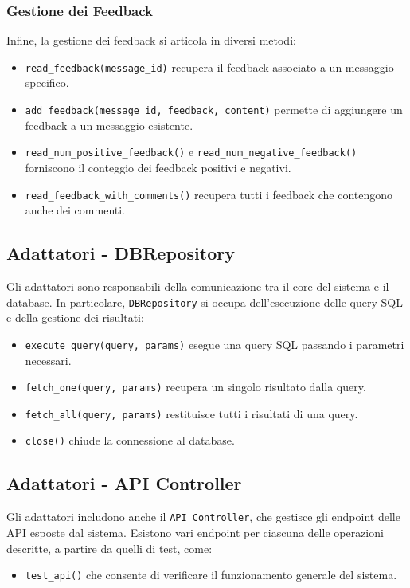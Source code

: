 \subsubsection*{Gestione dei Feedback}
Infine, la gestione dei feedback si articola in diversi metodi:
\begin{itemize}
    \item \texttt{read\_feedback(message\_id)} recupera il feedback associato a un messaggio specifico.
    \item \texttt{add\_feedback(message\_id, feedback, content)} permette di aggiungere un feedback a un messaggio esistente.
    \item \texttt{read\_num\_positive\_feedback()} e \texttt{read\_num\_negative\_feedback()} forniscono il conteggio dei feedback positivi e negativi.
    \item \texttt{read\_feedback\_with\_comments()} recupera tutti i feedback che contengono anche dei commenti.
\end{itemize}

\subsection*{Adattatori - DBRepository}
Gli adattatori sono responsabili della comunicazione tra il core del sistema e il database. In particolare, \texttt{DBRepository} si occupa dell'esecuzione delle query SQL e della gestione dei risultati:
\begin{itemize}
    \item \texttt{execute\_query(query, params)} esegue una query SQL passando i parametri necessari.
    \item \texttt{fetch\_one(query, params)} recupera un singolo risultato dalla query.
    \item \texttt{fetch\_all(query, params)} restituisce tutti i risultati di una query.
    \item \texttt{close()} chiude la connessione al database.
\end{itemize}

\subsection*{Adattatori - API Controller}
Gli adattatori includono anche il \texttt{API Controller}, che gestisce gli endpoint delle API esposte dal sistema. Esistono vari endpoint per ciascuna delle operazioni descritte, a partire da quelli di test, come:
\begin{itemize}
    \item \texttt{test\_api()} che consente di verificare il funzionamento generale del sistema.
\end{itemize}

